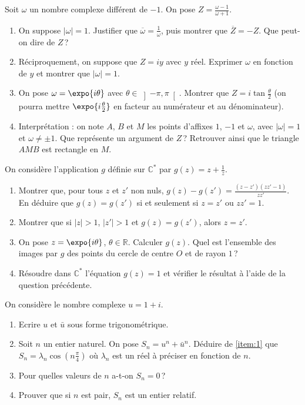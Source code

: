 \begin{exo}
	Soit $\omega$ un nombre complexe diff\'erent de $-1$. On pose $Z = \frac{\omega - 1}{\omega + 1}$.
	\begin{enumerate}
		\item On suppose $|\omega| = 1$.
		      Justifier que $\overline{\omega} = \frac{1}{\omega}$, puis montrer que $\overline{Z} = -Z$.
		      Que peut-on dire de $Z$\,?
		\item R\'eciproquement, on suppose que $Z = iy$ avec $y$ r\'eel.
		      Exprimer $\omega$ en fonction de $y$ et montrer que $|\omega| = 1$.
		\item On pose $\omega = \expo{i\theta}$ avec $\theta \in \left] -\pi , \pi \right[$.
		      Montrer que $Z = i \tan \frac{\theta}{2}$
		      (on pourra mettre $\expo{i\frac{\theta}{2}}$ en facteur au num\'erateur et au d\'enominateur).
		\item Interpr\'etation : on note $A$, $B$ et $M$ les points d'affixes $1$, $-1$ et $\omega$, avec $|\omega| = 1$ et $\omega \neq \pm 1$.
		      Que repr\'esente un argument de $Z$\,? Retrouver ainsi que le triangle $AMB$ est rectangle en $M$.
	\end{enumerate}
\end{exo}
%
\begin{exo}
	On consid\`ere l'application $g$ d\'efinie sur $\mathbb{C}^*$ par $g(z) = z + \frac{1}{z}$.
	\begin{enumerate}
		\item Montrer que, pour tous $z$ et $z'$ non nuls,
		      $g(z) - g(z') = \frac{(z - z')(z z' - 1)}{z z'}$.
		      En d\'eduire que $g(z) = g(z')$ si et seulement si $z = z'$ ou $z z' = 1$.
		\item Montrer que si $|z| > 1$, $|z'| > 1$ et $g(z) = g(z')$, alors $z = z'$.
		\item On pose $z = \expo{i\theta}$, $\theta \in \mathbb{R}$. Calculer $g(z)$.
		      Quel est l'ensemble des images par $g$ des points du cercle de centre $O$ et de rayon $1$\,?
		\item R\'esoudre dans $\mathbb{C}^*$ l'\'equation $g(z) = 1$ et v\'erifier le r\'esultat \`a l'aide de la question pr\'ec\'edente.
	\end{enumerate}
\end{exo}
\begin{exo}
      On consid\`ere le nombre complexe $u=1+i$.
      \begin{enumerate}
            \item Ecrire $u$ et $\bar{u}$ sous forme trigonom\'etrique.
                  \label{item:1}
            \item Soit $n$ un entier naturel.
                  On pose $S_n = u^n + \bar{u}^n$.
                  D\'eduire de \ref{item:1} que $S_n = \lambda_n \cos \left( n \frac{\pi}{4} \right)$
                  o\`u $\lambda_n$ est un r\'eel \`a pr\'eciser en fonction de $n$.
            \item Pour quelles valeurs de $n$ a-t-on $S_n = 0$\,?
            \item Prouver que si $n$ est pair, $S_n$ est un entier relatif.
      \end{enumerate}
\end{exo}

